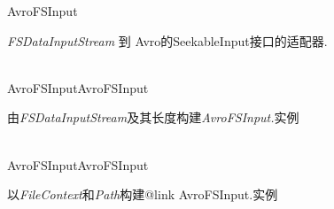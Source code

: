 \begin{XeClass}{AvroFSInput}
   
 \emph{FSDataInputStream} 到 Avro的SeekableInput接口的适配器. 

  \begin{XeMethod}{\XePublic\\ }{AvroFSInput}{AvroFSInput}
       
 由\emph{FSDataInputStream}及其长度构建\emph{AvroFSInput.}实例 

  \end{XeMethod}

  \begin{XeMethod}{\XePublic\\ }{AvroFSInput}{AvroFSInput}
       
 以\emph{FileContext}和\emph{Path}构建{@link AvroFSInput.}实例 

  \end{XeMethod}

\end{XeClass}
